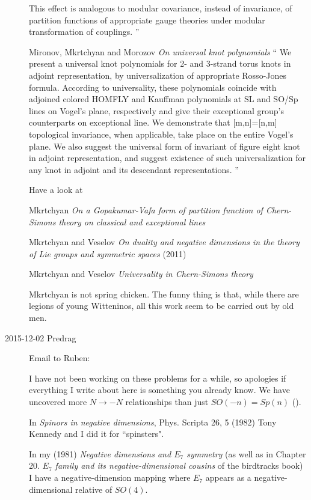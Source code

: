 \begin{description}
This effect is  analogous to modular covariance, instead of invariance,
of partition functions of appropriate gauge theories under modular
transformation of couplings.
''

Mironov, Mkrtchyan and Morozov
{\em On universal knot polynomials}
``
We present a universal knot polynomials for 2- and 3-strand torus knots
in adjoint representation, by universalization of appropriate Rosso-Jones
formula. According to universality, these polynomials coincide with
adjoined colored HOMFLY and Kauffman polynomials at SL and SO/Sp lines on
Vogel's plane, respectively and give their exceptional group's
counterparts on exceptional line. We demonstrate that [m,n]=[n,m]
topological invariance, when applicable, take place on the entire Vogel's
plane. We also suggest the universal form of invariant of figure eight
knot in adjoint representation, and suggest existence of such
universalization for any knot in adjoint and its descendant
representations.
''

Have a look at

Mkrtchyan {\em On a {Gopakumar-Vafa} form of
partition function of {Chern-Simons} theory on classical and exceptional
lines}

Mkrtchyan and Veselov
{\em On duality and negative dimensions in the theory of {Lie} groups and 
symmetric spaces} (2011) 

Mkrtchyan and Veselov
{\em Universality in {Chern-Simons} theory}

Mkrtchyan is not spring chicken. The funny thing is that, while there are
legions of young Witteninos, all this work seem to be carried out by old
men.



\item[2015-12-02  Predrag]
Email to Ruben:

I have not been working on these problems for a while, so apologies if
everything I write about here is something you already know. We have
uncovered more $N \to -N$ relationships than just $SO(-n)=Sp(n)$
().

In {\em Spinors in negative dimensions},
Phys. Scripta 26, 5 (1982) Tony Kennedy and I did it for ``spinsters".

In my (1981) {\em Negative dimensions and $E_7$ symmetry}
 (as well as in Chapter 20. {\em $E_7$ family and its
negative-dimensional cousins} of the birdtracks book) I have a
negative-dimension mapping where $E_7$  appears as a
negative-dimensional relative of $SO(4)$.


\end{description}
